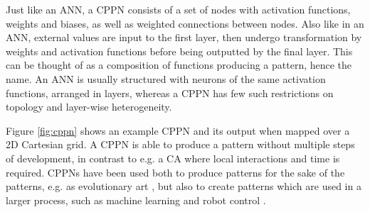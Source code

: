 Just like an ANN, a CPPN consists of a set of nodes with activation functions, weights and biases, as well as weighted connections between nodes.
Also like in an ANN, external values are input to the first layer, then undergo transformation by weights and activation functions before being outputted by the final layer.
This can be thought of as a composition of functions producing a pattern, hence the name.
An ANN is usually structured with neurons of the same activation functions,
arranged in layers,
whereas a CPPN has few such restrictions on topology and layer-wise heterogeneity.


Figure \ref{fig:cppn} shows an example CPPN and its output when mapped over a 2D Cartesian grid.
A CPPN is able to produce a pattern without multiple steps of development,
in contrast to e.g. a CA where local interactions and time is required.
CPPNs have been used both to produce patterns for the sake of the patterns, e.g. as evolutionary art \cite{stanley2006exploiting},
but also to create patterns which are used in a larger process,
such as machine learning \cite{d2008generative} and robot control \cite{risi2013confronting}.



